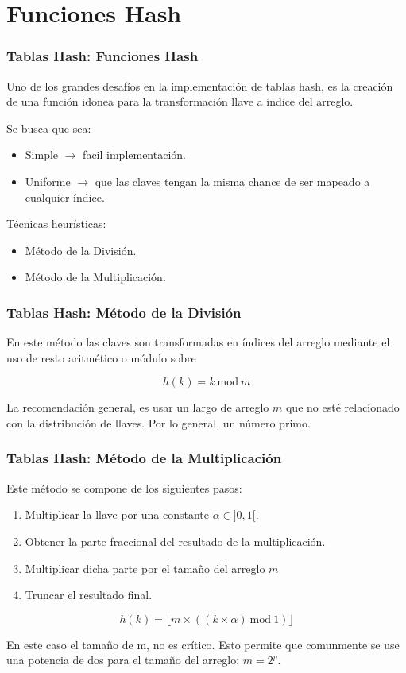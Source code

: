 \documentclass{beamer}
\begin{document}
\section{Funciones Hash}
\begin{frame}[fragile]
 \frametitle{Tablas Hash: Funciones Hash}
\small Uno de los grandes desafíos en la implementación de tablas hash, es la creación de una función idonea para la transformación llave a índice del arreglo.

Se busca que sea:
\begin{itemize}
\item Simple $\rightarrow$ facil implementación.
\item Uniforme $\rightarrow$ que las claves tengan la misma chance de ser mapeado a cualquier índice.
\end{itemize}

Técnicas heurísticas:
\begin{itemize}
\item Método de la División.
\item Método de la Multiplicación.
\end{itemize}

\end{frame}

\begin{frame}[fragile]
 \frametitle{Tablas Hash: Método de la División}
\small
En este método las claves son transformadas en índices del arreglo mediante el uso de resto aritmético o módulo sobre

$$ h(k) = k\ \mathrm{mod}\ m$$

La recomendación general, es usar un largo de arreglo $m$ que no esté relacionado con la distribución de llaves. Por lo general, un número primo. 
\end{frame}

\begin{frame}[fragile]
 \frametitle{Tablas Hash: Método de la Multiplicación}
\small
Este método se compone de los siguientes pasos:
\begin{enumerate}
\item Multiplicar la llave por una constante $\alpha \in ]0,1[$.
\item Obtener la parte fraccional del resultado de la multiplicación.
\item Multiplicar dicha parte por el tamaño del arreglo $m$
\item Truncar el resultado final.
\end{enumerate}

$$ h(k) = \lfloor m \times  ((k\times \alpha)\ \mathrm{mod}\ 1) \rfloor $$ 

En este caso el tamaño de m, no es crítico. Esto permite que comunmente se use una potencia de dos para el tamaño del arreglo: $m = 2^p$.
\end{frame}
\end{document}
